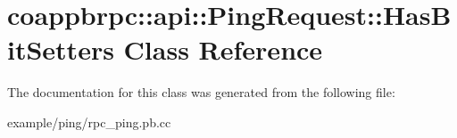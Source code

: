 \hypertarget{classcoappbrpc_1_1api_1_1PingRequest_1_1HasBitSetters}{}\section{coappbrpc\+:\+:api\+:\+:Ping\+Request\+:\+:Has\+Bit\+Setters Class Reference}
\label{classcoappbrpc_1_1api_1_1PingRequest_1_1HasBitSetters}


The documentation for this class was generated from the following file\+:\begin{DoxyCompactItemize}
\item 
example/ping/rpc\+\_\+ping.\+pb.\+cc\end{DoxyCompactItemize}
